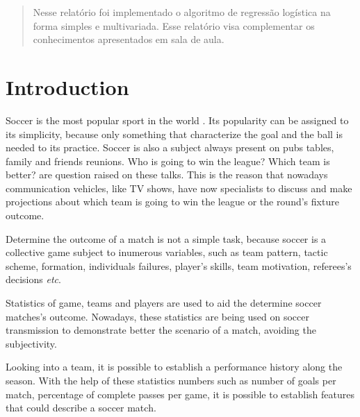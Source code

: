 \documentclass{article}
\begin{document}
 


\begin{abstract} 
Nesse relatório foi implementado o algoritmo de regressão logística na forma simples e multivariada. Esse relatório visa complementar os conhecimentos apresentados em sala de aula.
\end{abstract} 

\section{Introduction}
Soccer is the most popular sport in the world \cite{FIFA}. Its popularity can be assigned to its simplicity, because only something that characterize the goal and the ball is needed to its practice. Soccer is also a subject always present on pubs tables, family and friends reunions. Who is going to win the league? Which team is better? are question raised on these talks. This is the reason that nowadays communication vehicles, like TV shows, have now specialists to discuss and make projections about which team is going to win the league or the round's fixture outcome.

Determine the outcome of a match is not a simple task, because soccer is a collective game subject to inumerous variables, such as team pattern, tactic scheme, formation, individuals failures, player's skills, team motivation, referees's decisions \textit{etc}.

Statistics of game, teams and players are used to aid the determine soccer matches's outcome. Nowadays, these statistics are being used on soccer transmission to demonstrate better the scenario of a match, avoiding the subjectivity.

Looking into a team, it is possible to establish a performance history along the season. With the help of these statistics numbers such as number of goals per
match, percentage of complete passes per game, it is possible to establish features that could describe a soccer match. 
\end{document}

